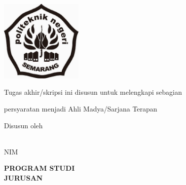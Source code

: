 \newpage
{}

\begin{center}
    
        \begin{doublespace}
              \textbf{\Large{\MakeUppercase{\judulid}}}\\[2cm]
        \end{doublespace}
    
    \includegraphics[width=0.3\textwidth]{Gambar/POLINES_Logo_2.jpg} \\%
    \vspace*{1.5 cm}
    {\large Tugas akhir/skripsi ini disusun untuk melengkapi sebagian \par}
    {\large persyaratan menjadi Ahli Madya/Sarjana Terapan \par}
    \vspace{1.5cm}

    {\Large Disusun oleh \par}
    \vspace{0.5cm}
    
    {\Large \penulis}\\
    \vspace{0.5cm}
    {\Large {NIM} \nim}
    \vspace{1.5cm}
    
    \begin{doublespace}
        \textbf{\Large \MakeUppercase{Program Studi \prodi}}\\
        \textbf{\Large \MakeUppercase{Jurusan \jurusan}}\\
        \textbf{\Large \MakeUppercase{\politeknik}}\\
        \textbf{\Large \MakeUppercase{\the\year{}}}\\
    \end{doublespace}
        
\end{center}



